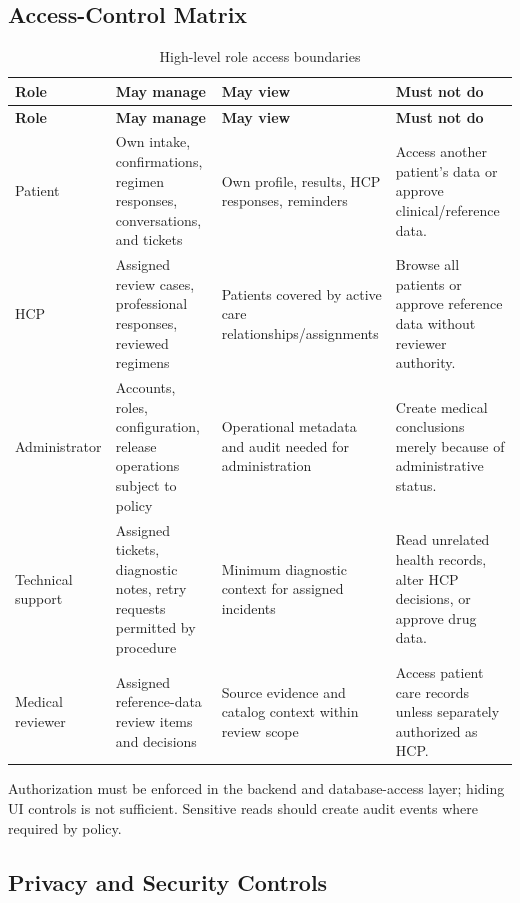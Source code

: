 \subsection{Access-Control Matrix}

\begin{longtable}{L{3.2cm}L{4.0cm}L{4.0cm}L{4.0cm}}
\caption{High-level role access boundaries}\label{tab:role-access}\\
\toprule
\textbf{Role} & \textbf{May manage} & \textbf{May view} & \textbf{Must not do}\\
\midrule
\endfirsthead
\toprule
\textbf{Role} & \textbf{May manage} & \textbf{May view} & \textbf{Must not do}\\
\midrule
\endhead
Patient & Own intake, confirmations, regimen responses, conversations, and tickets & Own profile, results, HCP responses, reminders & Access another patient's data or approve clinical/reference data.\\
HCP & Assigned review cases, professional responses, reviewed regimens & Patients covered by active care relationships/assignments & Browse all patients or approve reference data without reviewer authority.\\
Administrator & Accounts, roles, configuration, release operations subject to policy & Operational metadata and audit needed for administration & Create medical conclusions merely because of administrative status.\\
Technical support & Assigned tickets, diagnostic notes, retry requests permitted by procedure & Minimum diagnostic context for assigned incidents & Read unrelated health records, alter HCP decisions, or approve drug data.\\
Medical reviewer & Assigned reference-data review items and decisions & Source evidence and catalog context within review scope & Access patient care records unless separately authorized as HCP.\\
\bottomrule
\end{longtable}

Authorization must be enforced in the backend and database-access layer; hiding UI controls is not sufficient. Sensitive reads should create audit events where required by policy.

\subsection{Privacy and Security Controls}

